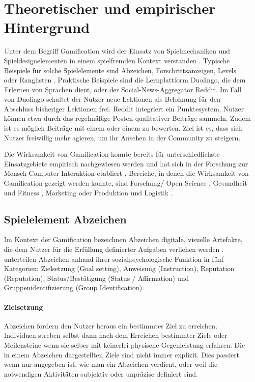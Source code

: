 \section{Theoretischer und empirischer Hintergrund}

Unter dem Begriff Gamification wird der Einsatz von Spielmechaniken und Spieldesignelementen in einem spielfremden Kontext verstanden \cite{deterding_game_2011}. Typische Beispiele für solche Spielelemente sind Abzeichen, Forschrittsanzeigen, Levels oder Ranglisten \cite{koch2013gamification}. Praktische Beispiele sind die Lernplattform Duolingo, die dem Erlernen von Sprachen dient, oder der Social-News-Aggregator Reddit. Im Fall von Duolingo schaltet der Nutzer neue Lektionen als Belohnung für den Abschluss bisheriger Lektionen frei. Reddit integriert ein Punktesystem. Nutzer können etwa durch das regelmäßige Posten qualitativer Beiträge  sammeln. Zudem ist es möglich Beiträge mit einem  oder einem  zu bewerten.
Ziel ist es, dass sich Nutzer freiwillig mehr agieren, um ihr Ansehen in der Community zu steigern.

Die Wirksamkeit von Gamification konnte bereits für unterschiedlichste Einsatzgebiete empirisch nachgewiesen werden \cite{koivisto_rise_2019} und hat sich in der Forschung zur Mensch-Computer-Interaktion etabliert \cite{huotari_defining_2012}. 
Bereiche, in denen die Wirksamkeit von Gamification gezeigt werden konnte, sind Forschung/ Open Science \cite{brauer_erhohung_2019,kidwell_badges_2016}, Gesundheit und Fitness \cite{johnson_gamification_2016}, Marketing \cite{huotari_defining_2012} oder Produktion und Logistik \cite{warmelink_gamification_2018}.

\subsection{Spielelement Abzeichen}
Im Kontext der Gamification bezeichnen Abzeichen digitale, visuelle Artefakte, die dem Nutzer für die Erfüllung definierter Aufgaben verliehen werden \cite{antin_badges_2011}. \citeauthor{antin_badges_2011} unterteilen Abzeichen anhand ihrer sozialpsychologische Funktion in fünf Kategorien: Zielsetzung (Goal setting), Anweisung (Instruction), Reputation (Reputation),
Status/Bestätigung (Status / Affirmation) und Gruppenidentifizierung (Group Identification). 

\paragraph{Zielsetzung}
Abzeichen fordern den Nutzer heraus ein bestimmtes Ziel zu erreichen. Individuen streben selbst dann nach dem Erreichen bestimmter Ziele oder Meilensteine wenn sie selber mit keinerlei physische Gegenleistung erfahren. Die in einem Abzeichen dargestellten Ziele sind nicht immer explizit. Dies passiert wenn nur angegeben ist, wie man ein Abzeichen verdient, oder weil die notwendigen Aktivitäten subjektiv oder unpräzise definiert sind.

